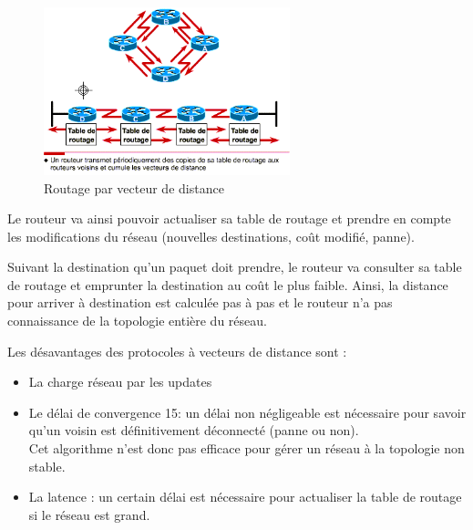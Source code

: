 \begin{figure}[h]
    \includegraphics[width=270px]{figures/routage_vect.png}
    \centering
    \caption{Routage par vecteur de distance \cite{Rout_vecteur}}
    \end{figure}

Le routeur va ainsi pouvoir actualiser sa table de routage et prendre en compte les modifications du réseau (nouvelles destinations, coût modifié, panne).
\medskip

Suivant la destination qu’un paquet doit prendre, le routeur va consulter sa table de routage et emprunter la destination au coût le plus faible. Ainsi, la distance pour arriver à destination est calculée pas à pas et le routeur n’a pas connaissance de la topologie entière du réseau.
\medskip

Les désavantages des protocoles à vecteurs de distance sont :

	\begin{itemize}
	\item La charge réseau par les updates
    \item Le délai de convergence 15: un délai non négligeable est nécessaire pour savoir qu’un voisin est définitivement déconnecté (panne ou non). 
    \\
    Cet algorithme n’est donc pas efficace pour gérer un réseau à la topologie non stable.
    \item La latence : un certain délai est nécessaire pour actualiser la table de routage si le réseau est grand.
	\end{itemize}

